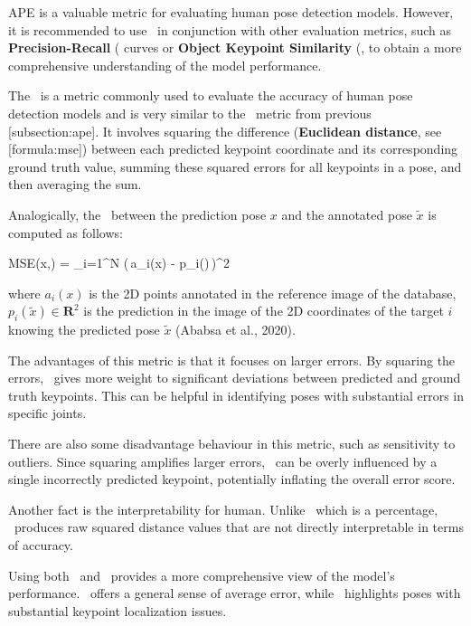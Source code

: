 APE is a valuable metric for evaluating human pose detection models. However, it is recommended to use \APE\ in conjunction with other evaluation metrics, such as {\bf Precision-Recall} (\PR\) curves or {\bf Object Keypoint Similarity} (\OKS\), to obtain a more comprehensive understanding of the model performance.

The \MSE\ is a metric commonly used to evaluate the accuracy of human pose detection models and is very similar to the \APE\ metric from previous [subsection:ape]. It involves squaring the difference ({\bf Euclidean distance}, see [formula:mse]) between each predicted keypoint coordinate and its corresponding ground truth value, summing these squared errors for all keypoints in a pose, and then averaging the sum.

Analogically, the \MSE\ between the prediction pose $ x $ and the annotated pose $ \tilde{x}$ is computed as follows:

\startplaceformula[reference=formula:mse]
    \startformula MSE(x,) =  \sum_{i=1}^{N} (\,a_i(x) - p_i()\,)^{2}
    \stopformula
\stopplaceformula

where $ a_i (x) $ is the 2D points annotated in the reference image of the database, $ p_i (\tilde{x}) \in  \mathbf R^2 $ is the prediction in the image of the 2D coordinates of the target $ i $ knowing the predicted pose $ \tilde{x} $ (Ababsa et al., 2020).

The advantages of this metric is that it focuses on larger errors. By squaring the errors, \MSE\ gives more weight to significant deviations between predicted and ground truth keypoints. This can be helpful in identifying poses with substantial errors in specific joints.

There are also some disadvantage behaviour in this metric, such as sensitivity to outliers. Since squaring amplifies larger errors, \MSE\ can be overly influenced by a single incorrectly predicted keypoint, potentially inflating the overall error score.

Another fact is the interpretability for human. Unlike \APE\, which is a percentage, \MSE\ produces raw squared distance values that are not directly interpretable in terms of accuracy.


Using both \APE\ and \MSE\ provides a more comprehensive view of the model's performance. \APE\ offers a general sense of average error, while \MSE\ highlights poses with substantial keypoint localization issues.

